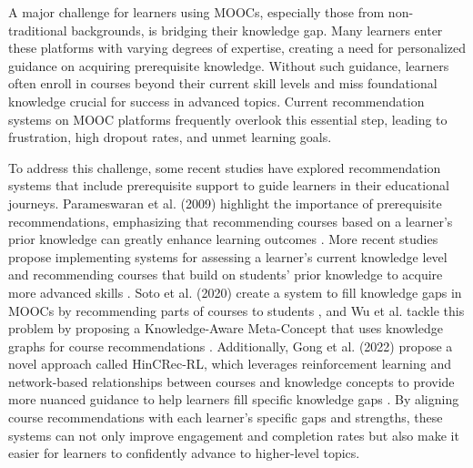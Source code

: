 A major challenge for learners using MOOCs, especially those from non-traditional backgrounds, is bridging their knowledge gap. Many learners enter these platforms with varying degrees of expertise, creating a need for personalized guidance on acquiring prerequisite knowledge. Without such guidance, learners often enroll in courses beyond their current skill levels and miss foundational knowledge crucial for success in advanced topics. Current recommendation systems on MOOC platforms frequently overlook this essential step, leading to frustration, high dropout rates, and unmet learning goals.

To address this challenge, some recent studies have explored recommendation systems that include prerequisite support to guide learners in their educational journeys. Parameswaran et al. (2009) highlight the importance of prerequisite recommendations, emphasizing that recommending courses based on a learner’s prior knowledge can greatly enhance learning outcomes \cite{parameswaran_recommendations_2009}. More recent studies propose implementing systems for assessing a learner’s current knowledge level and recommending courses that build on students’ prior knowledge to acquire more advanced skills \cite{noauthor_building_2017}. Soto et al. (2020) create a system to fill knowledge gaps in MOOCs by recommending parts of courses to students \cite{noauthor_vista_nodate}, and Wu et al. tackle this problem by proposing a Knowledge-Aware Meta-Concept that uses knowledge graphs for course recommendations \cite{wu_meta_2024}. Additionally, Gong et al. (2022) propose a novel approach called HinCRec-RL, which leverages reinforcement learning and network-based relationships between courses and knowledge concepts to provide more nuanced guidance to help learners fill specific knowledge gaps \cite{noauthor_reinforced_nodate}. By aligning course recommendations with each learner’s specific gaps and strengths, these systems can not only improve engagement and completion rates but also make it easier for learners to confidently advance to higher-level topics.

